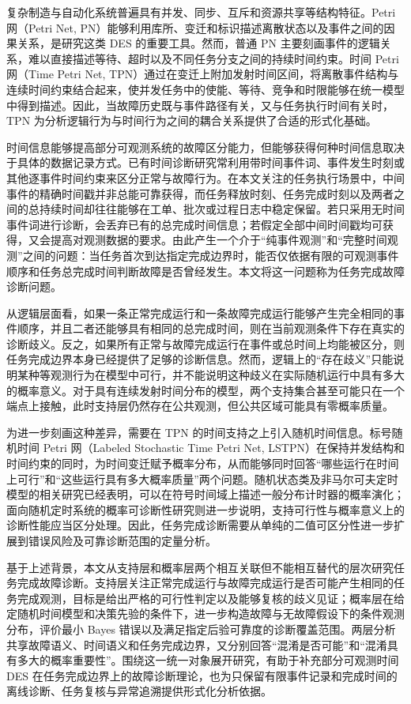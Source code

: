 \documentclass[master,fontset=ubuntu]{shnuthesis}
\theoremstyle{definition}
\begin{document}
复杂制造与自动化系统普遍具有并发、同步、互斥和资源共享等结构特征。Petri 网（Petri Net, PN）能够利用库所、变迁和标识描述离散状态以及事件之间的因果关系，是研究这类 DES 的重要工具\cite{Murata1989}。然而，普通 PN 主要刻画事件的逻辑关系，难以直接描述等待、超时以及不同任务分支之间的持续时间约束。时间 Petri 网（Time Petri Net, TPN）通过在变迁上附加发射时间区间，将离散事件结构与连续时间约束结合起来，使并发任务中的使能、等待、竞争和时限能够在统一模型中得到描述\cite{Berthomieu1991}。因此，当故障历史既与事件路径有关，又与任务执行时间有关时，TPN 为分析逻辑行为与时间行为之间的耦合关系提供了合适的形式化基础。

时间信息能够提高部分可观测系统的故障区分能力，但能够获得何种时间信息取决于具体的数据记录方式。已有时间诊断研究常利用带时间事件词、事件发生时刻或其他逐事件时间约束来区分正常与故障行为\cite{Basile2017,Basilio2025}。在本文关注的任务执行场景中，中间事件的精确时间戳并非总能可靠获得，而任务释放时刻、任务完成时刻以及两者之间的总持续时间却往往能够在工单、批次或过程日志中稳定保留。若只采用无时间事件词进行诊断，会丢弃已有的总完成时间信息；若假定全部中间时间戳均可获得，又会提高对观测数据的要求。由此产生一个介于“纯事件观测”和“完整时间观测”之间的问题：当任务首次到达指定完成边界时，能否仅依据有限的可观测事件顺序和任务总完成时间判断故障是否曾经发生。本文将这一问题称为任务完成故障诊断问题。

从逻辑层面看，如果一条正常完成运行和一条故障完成运行能够产生完全相同的事件顺序，并且二者还能够具有相同的总完成时间，则在当前观测条件下存在真实的诊断歧义。反之，如果所有正常与故障完成运行在事件或总时间上均能被区分，则任务完成边界本身已经提供了足够的诊断信息。然而，逻辑上的“存在歧义”只能说明某种等观测行为在模型中可行，并不能说明这种歧义在实际随机运行中具有多大的概率意义。对于具有连续发射时间分布的模型，两个支持集合甚至可能只在一个端点上接触，此时支持层仍然存在公共观测，但公共区域可能具有零概率质量。

为进一步刻画这种差异，需要在 TPN 的时间支持之上引入随机时间信息。标号随机时间 Petri 网（Labeled Stochastic Time Petri Net, LSTPN）在保持并发结构和时间约束的同时，为时间变迁赋予概率分布，从而能够同时回答“哪些运行在时间上可行”和“这些运行具有多大概率质量”两个问题。随机状态类及非马尔可夫定时模型的相关研究已经表明，可以在符号时间域上描述一般分布计时器的概率演化\cite{Carnevali2009,Vicario2009}；面向随机定时系统的概率可诊断性研究则进一步说明，支持可行性与概率意义上的诊断性能应当区分处理\cite{Lefebvre2023}。因此，任务完成诊断需要从单纯的二值可区分性进一步扩展到错误风险及可靠诊断范围的定量分析。

基于上述背景，本文从支持层和概率层两个相互关联但不能相互替代的层次研究任务完成故障诊断。支持层关注正常完成运行与故障完成运行是否可能产生相同的任务完成观测，目标是给出严格的可行性判定以及能够复核的歧义见证；概率层在给定随机时间模型和决策先验的条件下，进一步构造故障与无故障假设下的条件观测分布，评价最小 Bayes 错误以及满足指定后验可靠度的诊断覆盖范围。两层分析共享故障语义、时间语义和任务完成边界，又分别回答“混淆是否可能”和“混淆具有多大的概率重要性”。围绕这一统一对象展开研究，有助于补充部分可观测时间 DES 在任务完成边界上的故障诊断理论，也为只保留有限事件记录和完成时间的离线诊断、任务复核与异常追溯提供形式化分析依据。
\end{document}
